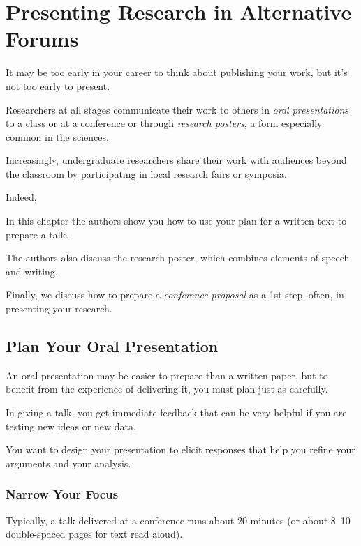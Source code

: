 \documentclass[oneside]{book}
\numberwithin{equation}{section}
\begin{document}
\chapter{Presenting Research in Alternative Forums}

It may be too early in your career to think about publishing your work, but it's not too early to present.

Researchers at all stages communicate their work to others in \textit{oral presentations} to a class or at a conference or through \textit{research posters}, a form especially common in the sciences.

Increasingly, undergraduate researchers share their work with audiences beyond the classroom by participating in local research fairs or symposia.


Indeed, 

%
In this chapter the authors show you how to use your plan for a written text to prepare a talk.

The authors also discuss the research poster, which combines elements of speech and writing.

Finally, we discuss how to prepare a \textit{conference proposal} as a 1st step, often, in presenting your research.

\section{Plan Your Oral Presentation}
An oral presentation may be easier to prepare than a written paper, but to benefit from the experience of delivering it, you must plan just as carefully.

In giving a talk, you get immediate feedback that can be very helpful if you are testing new ideas or new data.

You want to design your presentation to elicit responses that help you refine your arguments and your analysis.

\subsection{Narrow Your Focus}
Typically, a talk delivered at a conference runs about 20 minutes (or about 8--10 double-spaced pages for text read aloud).
\end{document}
